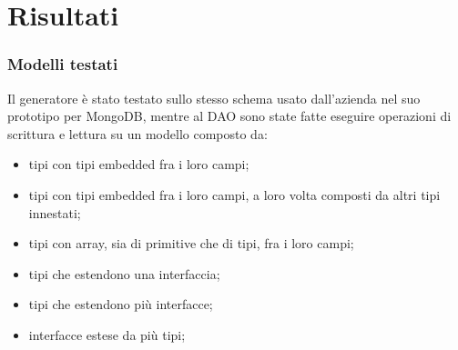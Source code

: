 \documentclass[c]{beamer}
\begin{document}
    \section{Risultati}
        \begin{frame}
            \frametitle{Modelli testati}
            Il generatore è stato testato sullo stesso schema usato dall'azienda nel suo prototipo per MongoDB, mentre al DAO sono state fatte eseguire
            operazioni di scrittura e lettura su un modello composto da:
            \begin{itemize}
                \item tipi con tipi embedded fra i loro campi;
                \item tipi con tipi embedded fra i loro campi, a loro volta composti da altri tipi innestati;
                \item tipi con array, sia di primitive che di tipi, fra i loro campi;
                \item tipi che estendono una interfaccia;
                \item tipi che estendono più interfacce;
                \item interfacce estese da più tipi;
            \end{itemize}
        \end{frame}
\end{document}
